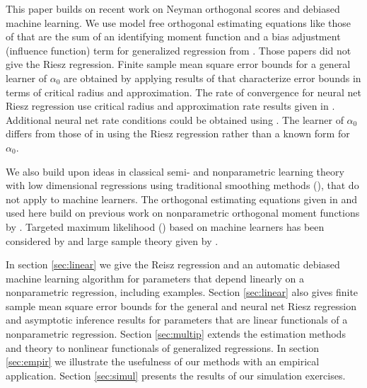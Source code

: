 \documentclass[aos]{imsart}
\numberwithin{equation}{section}
\theoremstyle{plain}
\theoremstyle{remark}
\begin{document}
This paper builds on recent work on Neyman orthogonal scores and debiased machine learning. 
We use model free orthogonal estimating equations like those of \cite{chernozhukov2022locally} 
that are the sum of an identifying moment function and a bias adjustment (influence function) term for generalized regression from \cite{ichimura2022influence}.
Those papers did not give the Riesz regression.
Finite sample mean square error bounds for a general learner of $\alpha_0$ are obtained by applying results of \cite{foster2019orthogonal} that characterize error bounds in terms of critical radius and approximation. 
The rate of convergence for neural net Riesz regression use critical radius and approximation rate results given in \cite{farrell2021deep}. 
Additional neural net rate conditions could be obtained using \cite{yarotsky2018optimal}. 
The learner of $\alpha_0$ differs from those of \cite{farrell2021deep, farrell2021deep2} in using the Riesz regression rather than a known form for $\alpha_0$.

We also build upon ideas in classical semi- and nonparametric learning theory with low dimensional regressions using traditional smoothing methods (\cite{van1991differentiable, bickel1993efficient, newey1994asymptotic, robins1995semiparametric, van2000asymptotic}),
that do not apply to  machine learners.  
The orthogonal estimating equations given in \cite{chernozhukov2022locally} and used here build on previous work on nonparametric orthogonal moment functions by  \cite{levit1975efficiency,hasminskii1978nonparametric,bickel1988estimating,newey2004twicing}.
Targeted maximum likelihood (\cite{van2006targeted}) based on machine learners has been considered by \cite{van2011targetedbook}  and large sample theory given by \cite{luedtke2016optimal}.  

In section \ref{sec:linear} we give the Reisz regression and an automatic debiased machine learning algorithm for parameters that depend linearly on a nonparametric regression, including examples. Section \ref{sec:linear} also gives finite sample mean square error bounds for the general and neural net Riesz regression and asymptotic inference results for parameters that are linear functionals of a nonparametric regression. 
Section \ref{sec:multip} extends the estimation methods and theory to nonlinear functionals of generalized regressions. 
In section \ref{sec:empir} we illustrate the usefulness of our methods with an empirical application. 
Section \ref{sec:simul} presents the results of our simulation exercises.
\end{document}
